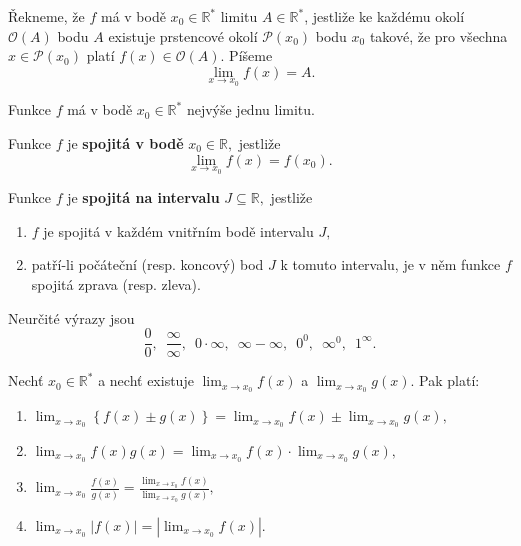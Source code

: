 \begin{definition}
Řekneme, že $f$ má v bodě $x_0\in \mathbb R^*$ limitu $A \in \mathbb R^*$,
jestliže ke každému okolí $\mathscr O(A)$ bodu $A$ existuje prstencové
okolí $\mathscr P(x_0)$ bodu $x_0$ takové, že pro všechna $x\in \mathscr P(x_0)$
platí $f(x)\in \mathscr O(A).$ Píšeme
$$
\lim_{x\to x_0}f(x)=A.
$$
\end{definition}

\begin{veta}
    Funkce $f$ má v bodě $x_0\in \mathbb R^*$ nejvýše jednu limitu.
\end{veta}

\begin{definition}
Funkce $f$ je \textbf{spojitá v bodě} $x_0\in \mathbb R,$ jestliže
$$\lim_{x\to x_0}f(x)=f(x_0).$$
\end{definition}

\begin{definition}
Funkce $f$ je \textbf{spojitá na intervalu} $J\subseteq \mathbb R,$ jestliže
\begin{enumerate}[$i.$]
\item $f$ je spojitá v každém vnitřním bodě intervalu $J,$
\item patří-li počáteční (resp. koncový) bod $J$ k tomuto intervalu,
je v něm funkce $f$ spojitá zprava (resp. zleva).
\end{enumerate}
\end{definition}

\begin{pozn}
Neurčité výrazy jsou
$$\frac{0}{0},  \,\,\, \frac{\infty}{\infty}, \,\,\, 0\cdot \infty, \,\,\, \infty - \infty, \,\,\,0^0,\,\,\, \infty^0,\,\,\, 1^\infty.$$
\end{pozn}

\begin{veta}
Nechť $x_0\in \mathbb R^*$ a nechť existuje $\lim_{x\to x_0}f(x)$ a $\lim_{x\to x_0}g(x)$.
Pak platí:
\begin{enumerate}[$i.$]
\item $\lim_{x\to x_0} \left \{ f(x)\pm g(x) \right \}= \lim_{x\to x_0}f(x) \pm \lim_{x\to x_0}g(x),$
\item $\lim_{x\to x_0}f(x)g(x)=\lim_{x\to x_0}f(x)\cdot \lim_{x\to x_0}g(x),$
\item $\lim_{x\to x_0}\frac{f(x)}{g(x)}=\frac{\lim_{x\to x_0}f(x)}{\lim_{x\to x_0}g(x)},$
\item $\lim_{x\to x_0}|f(x)| = |\lim_{x\to x_0}f(x)|.$
\end{enumerate}
\end{veta}


